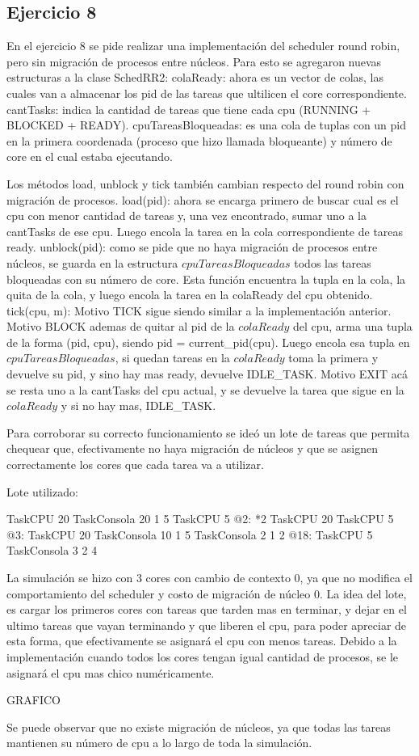 \subsection{Ejercicio 8}

En el ejercicio 8 se pide realizar una implementación del scheduler round robin, pero sin migración de procesos entre núcleos.
Para esto se agregaron nuevas estructuras a la clase SchedRR2:
colaReady: ahora es un vector de colas, las cuales van a almacenar los pid de las tareas que ultilicen el core correspondiente.
cantTasks: indica la cantidad de tareas que tiene cada cpu (RUNNING + BLOCKED + READY).
cpuTareasBloqueadas: es una cola de tuplas con un pid en la primera coordenada (proceso que hizo llamada bloqueante) y número de core en el cual estaba ejecutando.

Los métodos load, unblock y tick también cambian respecto del round robin con migración de procesos.
load(pid): ahora se encarga primero de buscar cual es el cpu con menor cantidad de tareas y, una vez encontrado, sumar uno a la cantTasks de ese cpu. Luego encola la tarea en la cola correspondiente de tareas ready.
unblock(pid): como se pide que no haya migración de procesos entre núcleos, se guarda en la estructura $cpuTareasBloqueadas$ todos las tareas bloqueadas con su número de 
core. Esta función encuentra la tupla en la cola, la quita de la cola, y luego encola la tarea en la colaReady del cpu obtenido.
tick(cpu, m): 
Motivo TICK sigue siendo similar a la implementación anterior.
Motivo BLOCK ademas de quitar al pid de la $colaReady$ del cpu, arma una tupla de la forma (pid, cpu), siendo pid = current_pid(cpu). Luego encola esa tupla en $cpuTareasBloqueadas$, 
si quedan tareas en la $colaReady$ toma la primera y devuelve su pid, y sino hay mas ready, devuelve IDLE_TASK.
Motivo EXIT acá se resta uno a la cantTasks del cpu actual, y se devuelve la tarea que sigue en la $colaReady$ y si no hay mas, IDLE_TASK.

Para corroborar su correcto funcionamiento se ideó un lote de tareas que permita chequear que, efectivamente no haya migración de núcleos y que se asignen correctamente 
los cores que cada tarea va a utilizar. 

Lote utilizado:

TaskCPU 20		
TaskConsola 20	1 5	
TaskCPU 5
@2: 
*2 TaskCPU 20
TaskCPU 5
@3:
TaskCPU 20
TaskConsola 10 1 5
TaskConsola 2 1 2
@18:				
TaskCPU 5
TaskConsola 3 2 4

La simulación se hizo con 3 cores con cambio de contexto 0, ya que no modifica el comportamiento del scheduler y costo de migración de núcleo 0.
La idea del lote, es cargar los primeros cores con tareas que tarden mas en terminar, y dejar en el ultimo tareas que vayan terminando y que liberen el cpu, 
para poder apreciar de esta forma, que efectivamente se asignará el cpu con menos tareas.
Debido a la implementación cuando todos los cores tengan igual cantidad de procesos, se le asignará el cpu mas chico numéricamente. 

GRAFICO

Se puede observar que no existe migración de núcleos, ya que todas las tareas mantienen su número de cpu a lo largo de toda la simulación.









